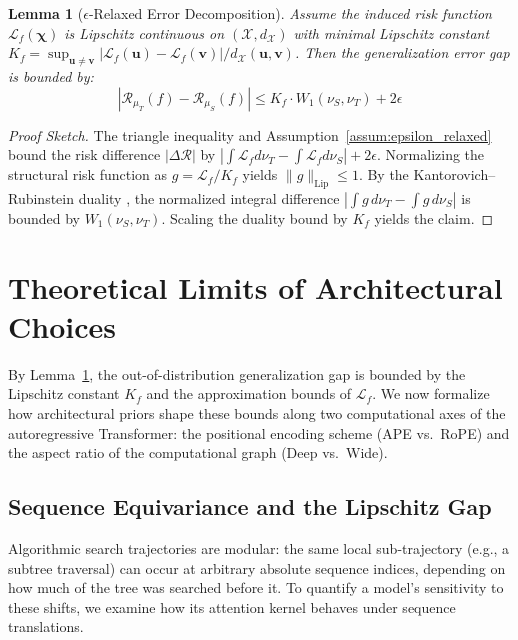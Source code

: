 \documentclass{article}
\newtheorem{lemma}{Lemma}
\begin{document}
\begin{lemma}[$\epsilon$-Relaxed Error Decomposition]
\label{lemma:error_decomposition}
Assume the induced risk function $\mathcal{L}_f(\boldsymbol{\chi})$ is Lipschitz continuous on $(\mathcal{X}, d_{\mathcal{X}})$ with minimal Lipschitz constant $K_f = \sup_{\boldsymbol{u} \neq \boldsymbol{v}} |\mathcal{L}_f(\boldsymbol{u}) - \mathcal{L}_f(\boldsymbol{v})| / d_{\mathcal{X}}(\boldsymbol{u}, \boldsymbol{v})$. Then the generalization error gap is bounded by:
\begin{equation}
    |\mathcal{R}_{\mu_T}(f) - \mathcal{R}_{\mu_S}(f)| \le K_f \cdot W_1(\nu_S, \nu_T) + 2\epsilon
\end{equation}
\end{lemma}

\begin{proof}[Proof Sketch]
The triangle inequality and Assumption~\ref{assum:epsilon_relaxed} bound the risk difference $|\Delta \mathcal{R}|$ by $|\int \mathcal{L}_f d\nu_T - \int \mathcal{L}_f d\nu_S| + 2\epsilon$. Normalizing the structural risk function as $g = \mathcal{L}_f / K_f$ yields $\|g\|_{\mathrm{Lip}} \le 1$. By the Kantorovich--Rubinstein duality \citep{Villani2009}, the normalized integral difference $|\int g \, d\nu_T - \int g \, d\nu_S|$ is bounded by $W_1(\nu_S, \nu_T)$. Scaling the duality bound by $K_f$ yields the claim.
\end{proof}

\section{Theoretical Limits of Architectural Choices}
\label{sec:theoretical_limits}

By Lemma~\ref{lemma:error_decomposition}, the out-of-distribution generalization gap is bounded by the Lipschitz constant $K_f$ and the approximation bounds of $\mathcal{L}_f$. We now formalize how architectural priors shape these bounds along two computational axes of the autoregressive Transformer: the positional encoding scheme (APE vs.\ RoPE) and the aspect ratio of the computational graph (Deep vs.\ Wide).

\subsection{Sequence Equivariance and the Lipschitz Gap}

Algorithmic search trajectories are modular: the same local sub-trajectory (e.g., a subtree traversal) can occur at arbitrary absolute sequence indices, depending on how much of the tree was searched before it. To quantify a model's sensitivity to these shifts, we examine how its attention kernel behaves under sequence translations.
\end{document}
